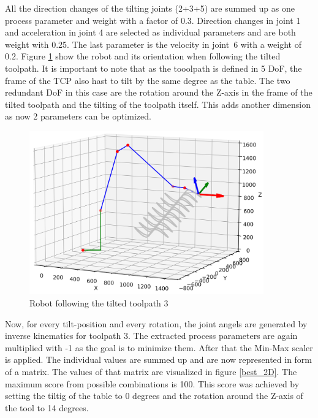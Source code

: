 All the direction changes of the tilting joints (2+3+5) are summed up as one process parameter and weight with a factor of 0.3. Direction changes in joint 1 and acceleration in joint 4 are selected as individual parameters and are both weight with 0.25. The last parameter is the velocity in joint~6 with a weight of 0.2.  
\newpage
Figure \ref{TP3_25_robot} show the robot and its orientation when following the tilted toolpath. It is important to note that as the tooolpath is defined in 5 DoF, the frame of the TCP also hast to tilt by the same degree as the table. The two redundant DoF in this case are the rotation around the Z-axis in the frame of the tilted toolpath and the tilting of the toolpath itself. This adds another dimension as now 2 parameters can be optimized.


\begin{figure}[H]
	\centerline{\includegraphics[width=0.9\textwidth]{figures/robotANDpath3_25.png}}
	\caption{Robot following the tilted toolpath 3}
	\label{TP3_25_robot}
\end{figure}

Now, for every tilt-position and every rotation, the joint angels are generated by inverse kinematics for toolpath 3. The extracted process parameters are again multiplied with -1 as the goal is to minimize them. After that the Min-Max scaler is applied. The individual values are summed up and are now represented in form of a matrix. The values of that matrix are visualized in figure \ref{best_2D}. The maximum score from possible combinations is 100. This score was achieved by setting the tiltig of the table to 0 degrees and the rotation around the Z-axis of the tool to 14 degrees.



